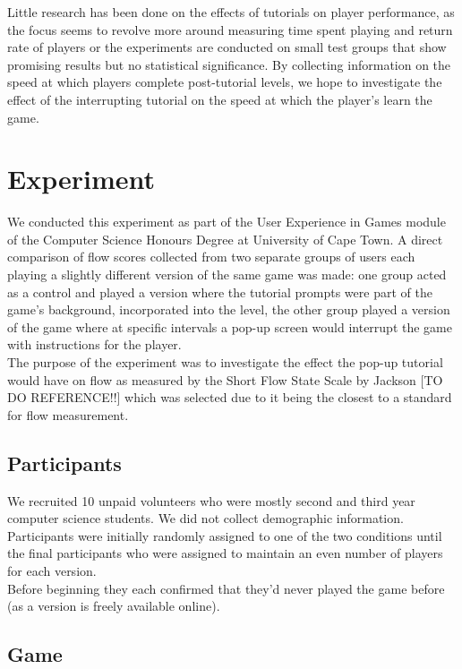 \documentclass{acmsiggraph}
\begin{document}
Little research has been done on the effects of tutorials on player performance, as the focus seems to revolve more around measuring time spent playing and return rate of players \cite{andersen} or the experiments are conducted on small test groups \cite{hill} that show promising results but no statistical significance. By collecting information on the speed at which players complete post-tutorial levels, we hope to investigate the effect of the interrupting tutorial on the speed at which the player’s learn the game.


\section{Experiment}

We conducted this experiment as part of the User Experience in Games module of the Computer Science Honours Degree at University of Cape Town. A direct comparison of flow scores collected from two separate groups of users each playing a slightly different version of the same game was made: one group acted as a control and played a version where the tutorial prompts were part of the game's background, incorporated into the level, the other group played a version of the game where at specific intervals a pop-up screen would interrupt the game with instructions for the player.\\
The purpose of the experiment was to investigate the effect the pop-up tutorial would have on flow as measured by the Short Flow State Scale by Jackson [TO DO REFERENCE!!] which was selected due to it being the closest to a standard for flow measurement.

\subsection{Participants}

We recruited 10 unpaid volunteers who were mostly second and third year computer science students. We did not collect demographic information. Participants were initially randomly assigned to one of the two conditions until the final participants who were assigned to maintain an even number of players for each version.\\
Before beginning they each confirmed that they'd never played the game before (as a version is freely available online).

\subsection{Game}
\end{document}
